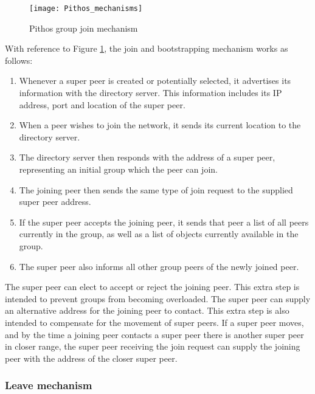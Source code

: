 \begin{figure}[htbp]
 \centering
 \texttt{[image: Pithos\_mechanisms]}
 \caption{Pithos group join mechanism}
 \label{fig_pithos_join}
\end{figure}
%
With reference to Figure \ref{fig_pithos_join}, the join and bootstrapping mechanism works as follows:
%
\begin{enumerate}
\item Whenever a super peer is created or potentially selected, it advertises its information with the directory server. This information includes its IP address, port and location of the super peer.

\item When a peer wishes to join the network, it sends its current location to the directory server.

\item  The directory server then responds with the address of a super peer, representing an initial group which the peer can join.

\item The joining peer then sends the same type of join request to the supplied super peer address.

\item If the super peer accepts the joining peer, it sends that peer a list of all peers currently in the group, as well as a list of objects currently available in the group.

\item The super peer also informs all other group peers of the newly joined peer.
\end{enumerate}

The super peer can elect to accept or reject the joining peer. This extra step is intended to prevent groups from becoming overloaded. The super peer can supply an alternative address for the joining peer to contact. This extra step is also intended to compensate for the movement of super peers. If a super peer moves, and by the time a joining peer contacts a super peer there is another super peer in closer range, the super peer receiving the join request can supply the joining peer with the address of the closer super peer.

\subsubsection{Leave mechanism}
\label{leave_design}

